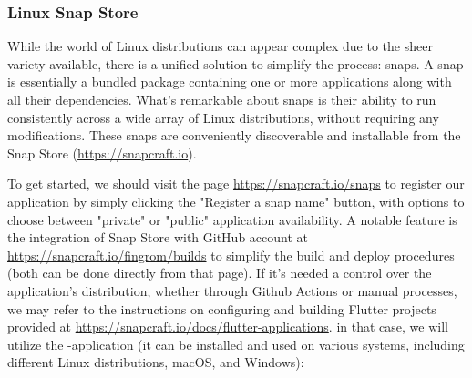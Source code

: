 
\subsubsection{Linux Snap Store}

While the world of Linux distributions can appear complex due to the sheer variety available, there is a unified
solution to simplify the process: snaps. A snap is essentially a bundled package containing one or more applications
along with all their dependencies. What's remarkable about snaps is their ability to run consistently across a wide
array of Linux distributions, without requiring any modifications. These snaps are conveniently discoverable and
installable from the Snap Store (\href{https://snapcraft.io}{https://snapcraft.io}).

To get started, we should visit the page \href{https://snapcraft.io/snaps}{https://snapcraft.io/snaps} to register
our application by simply clicking the "Register a snap name" button, with options to choose between "private" or
"public" application availability. A notable feature is the integration of Snap Store with GitHub account at
\href{https://snapcraft.io/fingrom/builds}{https://snapcraft.io/fingrom/builds} to simplify the build and deploy
procedures (both can be done directly from that page). If it's needed a control over the application's distribution,
whether through Github Actions or manual processes, we may refer to the instructions on configuring and building
Flutter projects provided at
\href{https://snapcraft.io/docs/flutter-applications}{https://snapcraft.io/docs/flutter-applications}.
in that case, we will utilize the -application (it can be installed and used on various systems, including
different Linux distributions, macOS, and Windows):

